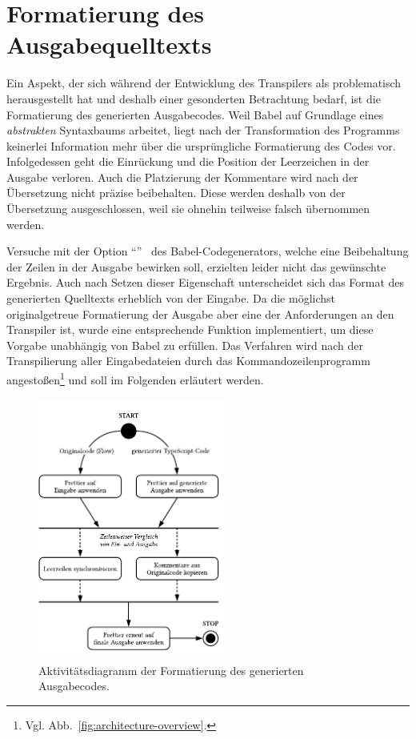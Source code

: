 \section{Formatierung des Ausgabequelltexts}
\label{sec:formatting}

Ein Aspekt, der sich während der Entwicklung des Transpilers als problematisch herausgestellt hat und deshalb einer gesonderten Betrachtung bedarf, ist die Formatierung des generierten Ausgabecodes. Weil Babel auf Grundlage eines \emph{abstrakten} Syntaxbaums arbeitet, liegt nach der Transformation des Programms keinerlei Information mehr über die ursprüngliche Formatierung des Codes vor. Infolgedessen geht die Einrückung und die Position der Leerzeichen in der Ausgabe verloren. Auch die Platzierung der Kommentare wird nach der Übersetzung nicht präzise beibehalten. Diese werden deshalb von der Übersetzung ausgeschlossen, weil sie ohnehin teilweise falsch übernommen werden.

Versuche mit der Option \enquote{}~\autocite{BABEL:GENERATOR} des Babel-Codegenerators, welche eine Beibehaltung der Zeilen in der Ausgabe bewirken soll, erzielten leider nicht das gewünschte Ergebnis. Auch nach Setzen dieser Eigenschaft unterscheidet sich das Format des generierten Quelltexts erheblich von der Eingabe. Da die möglichst originalgetreue Formatierung der Ausgabe aber eine der Anforderungen an den Transpiler ist, wurde eine entsprechende Funktion implementiert, um diese Vorgabe unabhängig von Babel zu erfüllen. Das Verfahren wird nach der Transpilierung aller Eingabedateien durch das Kommandozeilenprogramm angestoßen\footnote{Vgl. Abb.~\ref{fig:architecture-overview}.} und soll im Folgenden erläutert werden.

\begin{figure}[htb]
  \centering
  \includegraphics[width=0.55\textwidth]{src/4_Umsetzung/fig/activity-diagram-formatting.pdf}
  \caption[Aktivitätsdiagramm der Formatierung des Ausgabecodes]{Aktivitätsdiagramm der Formatierung des generierten Ausgabecodes.}
  \label{fig:activity-diagram-formatting}
\end{figure}

